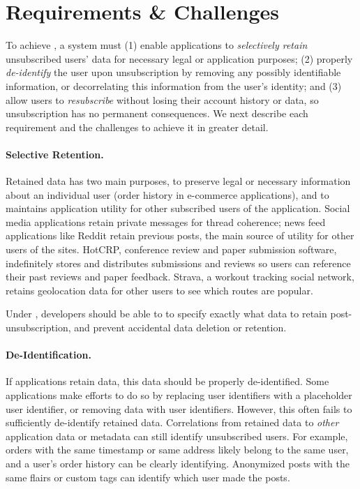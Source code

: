 \section{\sys Requirements \& Challenges}

To achieve \sys, a system must (1) enable applications to \emph{selectively retain} unsubscribed
users' data for necessary legal or application purposes; (2) properly \emph{de-identify} the user
upon unsubscription by removing any possibly identifiable information, or decorrelating this
information from the user's identity; and (3) allow users to \emph{resubscribe} without losing their
account history or data, so unsubscription has no permanent consequences. We next describe each
requirement and the challenges to achieve it in greater detail.

\paragraph{Selective Retention.}
Retained data has two main purposes, to preserve legal or
necessary information about an individual user (\eg order history in e-commerce applications), and
to maintains application utility for other subscribed users of the application.  Social media
applications retain private messages for thread coherence; news feed applications like Reddit retain
previous posts, the main source of utility for other users of the sites.  HotCRP, conference review
and paper submission software, indefinitely stores and distributes submissions and reviews so users
can reference their past reviews and paper feedback. Strava, a workout tracking social network,
retains geolocation data for other users to see which routes are popular.

Under \sys, developers should be able to to specify exactly what data to retain 
post-unsubscription, and prevent accidental data deletion or retention.

\paragraph{De-Identification.}
If applications retain data, this data should be properly de-identified. 
Some applications make efforts to do so by replacing user identifiers with a placeholder user
identifier, or removing data with user identifiers. However, this often fails to sufficiently
de-identify retained data. Correlations from retained data to \emph{other} application data or
metadata can still identify unsubscribed users. For example, orders with the same
timestamp or same address likely belong to the same user, and a user's order
history can be clearly identifying. Anonymized posts with the same flairs or custom tags 
can identify which user made the posts.


